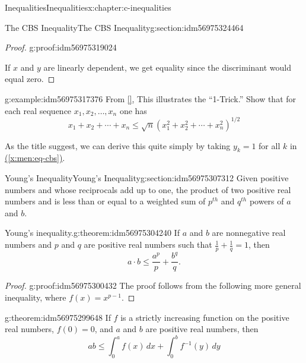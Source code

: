 \documentclass[twoside,10pt,]{book}
\newcommand{\xreffont}{\relax}
\numberwithin{equation}{section}
\begin{document}
\begin{chapterptx}{Inequalities}{}{Inequalities}{}{}{x:chapter:c-inequalities}
\begin{sectionptx}{The CBS Inequality}{}{The CBS Inequality}{}{}{g:section:idm56975324464}
\begin{proof}{}{g:proof:idm56975319024}
\par
If  \(x\) and \(y\) are linearly dependent, we get equality since the discriminant would equal zero.%
\end{proof}
\begin{example}{}{g:example:idm56975317376}%
From \hyperlink{x:biblio:biblio-steele-2004}{[{\xreffont 15}]}, This illustrates the ``1-Trick.''  Show that for each real sequence \(x_1, x_2, \dots, x_n\) one has%
\begin{equation*}
x_1 + x_2 + \cdots + x_n \leq \sqrt{n} \left(x_1^2 + x_2^2 + \cdots + x_n^2\right)^{1/2} 
\end{equation*}
%
\par
As the title suggest, we can derive this quite simply by taking \(y_k = 1\) for all \(k\) in \hyperref[x:men:eq-cbs]{({\xreffont\ref{x:men:eq-cbs}})}.%
\end{example}
\end{sectionptx}
%
%
\typeout{************************************************}
\typeout{************************************************}
%
\begin{sectionptx}{Young's Inequality}{}{Young's Inequality}{}{}{g:section:idm56975307312}
Given positive numbers  and  whose reciprocals add up to one, the product  of two positive real numbers  and  is less than or equal to a weighted sum of \(p^{th}\) and \(q^{th}\) powers  of \(a\) and \(b\).%
\begin{theorem}{Young's inequality.}{}{g:theorem:idm56975304240}%
%
If \(a\) and \(b\) are nonnegative real numbers and \(p\) and \(q\) are positive real numbers such that \(\frac{1}{p} + \frac{1}{q} = 1\), then%
\begin{equation*}
a\cdot b \leq \frac{a^{p}}{p} + \frac{b^{q}}{q}.
\end{equation*}
%
\end{theorem}
\begin{proof}{}{g:proof:idm56975300432}
The proof follows from the following more general inequality, where \(f(x)=x^{p-1}\).%
\end{proof}
\begin{theorem}{}{}{g:theorem:idm56975299648}%
If \(f\) is a strictly increasing function on the positive real numbers, \(f(0)=0\), and \(a\) and \(b\) are positive real numbers, then%
\begin{equation*}
a b \leq \int_0^a f(x) \, dx +\int_0^b f^{-1}(y) \, dy
\end{equation*}
%
\end{theorem}

\end{sectionptx}
\end{chapterptx}
\end{document}
